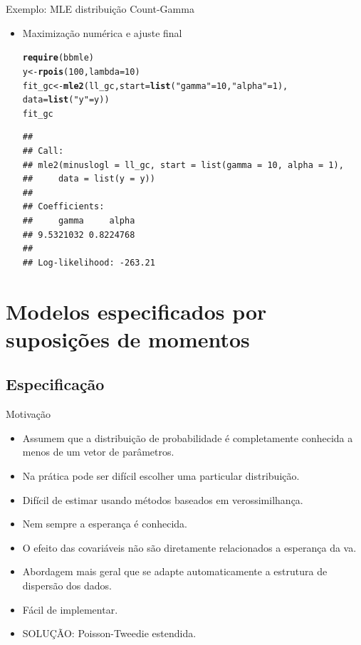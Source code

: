 \documentclass[10pt, aspectratio=169]{beamer}\usepackage[]{graphicx}\usepackage[]{color}
\makeatletter
\newcommand{\hlnum}[1]{\textcolor[rgb]{0.686,0.059,0.569}{#1}}%
\newcommand{\hlstr}[1]{\textcolor[rgb]{0.192,0.494,0.8}{#1}}%
\newcommand{\hlstd}[1]{\textcolor[rgb]{0.345,0.345,0.345}{#1}}%
\newcommand{\hlkwb}[1]{\textcolor[rgb]{0.69,0.353,0.396}{#1}}%
\newcommand{\hlkwc}[1]{\textcolor[rgb]{0.333,0.667,0.333}{#1}}%
\newcommand{\hlkwd}[1]{\textcolor[rgb]{0.737,0.353,0.396}{\textbf{#1}}}%
\newenvironment{kframe}{%
 \def\at@end@of@kframe{}%
 \ifinner\ifhmode%
  \def\at@end@of@kframe{\end{minipage}}%
  \begin{minipage}{\columnwidth}%
 \fi\fi%
 \def\FrameCommand##1{\hskip\@totalleftmargin \hskip-\fboxsep
 \colorbox{shadecolor}{##1}\hskip-\fboxsep
     \hskip-\linewidth \hskip-\@totalleftmargin \hskip\columnwidth}%
 \MakeFramed {\advance\hsize-\width
   \@totalleftmargin\z@ \linewidth\hsize
   \@setminipage}}%
 {\par\unskip\endMakeFramed%
 \at@end@of@kframe}
\newenvironment{knitrout}{}{} %
\makeatother
\begin{document}
\begin{frame}[fragile]{Exemplo: MLE distribuição Count-Gamma}
\begin{itemize}
  \item Maximização numérica e ajuste final
\begin{knitrout}
\color{fgcolor}\begin{kframe}
\begin{alltt}
\hlkwd{require}\hlstd{(bbmle)}
\hlstd{y} \hlkwb{<-} \hlkwd{rpois}\hlstd{(}\hlnum{100}\hlstd{,} \hlkwc{lambda} \hlstd{=} \hlnum{10}\hlstd{)}
\hlstd{fit_gc} \hlkwb{<-} \hlkwd{mle2}\hlstd{(ll_gc,} \hlkwc{start} \hlstd{=} \hlkwd{list}\hlstd{(}\hlstr{"gamma"} \hlstd{=} \hlnum{10}\hlstd{,} \hlstr{"alpha"} \hlstd{=} \hlnum{1}\hlstd{),}
               \hlkwc{data} \hlstd{=} \hlkwd{list}\hlstd{(}\hlstr{"y"} \hlstd{= y))}
\hlstd{fit_gc}
\end{alltt}
\begin{verbatim}
## 
## Call:
## mle2(minuslogl = ll_gc, start = list(gamma = 10, alpha = 1), 
##     data = list(y = y))
## 
## Coefficients:
##     gamma     alpha 
## 9.5321032 0.8224768 
## 
## Log-likelihood: -263.21
\end{verbatim}
\end{kframe}
\end{knitrout}

\end{itemize}
\end{frame}

\section{Modelos especificados por suposições de momentos}
\label{Section4}




\subsection{Especificação}
\begin{frame}{Motivação}
\begin{itemize}
  \item Assumem que a distribuição de probabilidade é completamente
  conhecida a menos de um vetor de parâmetros.
  \item Na prática pode ser difícil escolher uma particular distribuição.
  \item Difícil de estimar usando métodos baseados em verossimilhança.
  \item Nem sempre a esperança é conhecida.
  \item O efeito das covariáveis não são diretamente relacionados a esperança da va.
  \item Abordagem mais geral que se adapte automaticamente a estrutura de dispersão dos dados.
  \item Fácil de implementar.
  \item SOLUÇÃO: Poisson-Tweedie estendida.
\end{itemize}
\end{frame}
\end{document}
